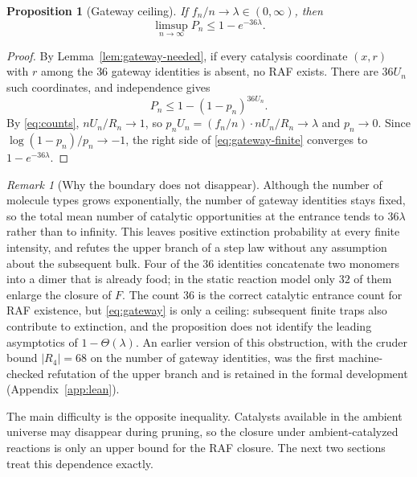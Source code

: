 \documentclass[11pt,reqno]{amsart}
\theoremstyle{plain}
\newtheorem{proposition}[theorem]{Proposition}
\theoremstyle{definition}
\theoremstyle{remark}
\newtheorem{remark}[theorem]{Remark}
\numberwithin{equation}{section}
\begin{document}
\begin{proposition}[Gateway ceiling]\label{prop:gateway}
If $f_n/n\to\lambda\in(0,\infty)$, then
\begin{equation}\label{eq:gateway}
\limsup_{n\to\infty}P_n\le1-e^{-36\lambda}.
\end{equation}
\end{proposition}

\begin{proof}
By Lemma~\ref{lem:gateway-needed}, if every catalysis coordinate $(x,r)$ with $r$ among the $36$ gateway identities is absent, no RAF exists. There are $36U_n$ such coordinates, and independence gives
\begin{equation}\label{eq:gateway-finite}
P_n\le1-(1-p_n)^{36U_n}.
\end{equation}
By \eqref{eq:counts}, $nU_n/R_n\to1$, so $p_nU_n=(f_n/n)\cdot nU_n/R_n\to\lambda$ and $p_n\to0$. Since $\log(1-p_n)/p_n\to-1$, the right side of \eqref{eq:gateway-finite} converges to $1-e^{-36\lambda}$.
\end{proof}

\begin{remark}[Why the boundary does not disappear]
Although the number of molecule types grows exponentially, the number of gateway identities stays fixed, so the total mean number of catalytic opportunities at the entrance tends to $36\lambda$ rather than to infinity. This leaves positive extinction probability at every finite intensity, and refutes the upper branch of a step law without any assumption about the subsequent bulk. Four of the $36$ identities concatenate two monomers into a dimer that is already food; in the static reaction model only $32$ of them enlarge the closure of $F$. The count $36$ is the correct catalytic entrance count for RAF existence, but \eqref{eq:gateway} is only a ceiling: subsequent finite traps also contribute to extinction, and the proposition does not identify the leading asymptotics of $1-\Theta(\lambda)$. An earlier version of this obstruction, with the cruder bound $|R_4|=68$ on the number of gateway identities, was the first machine-checked refutation of the upper branch and is retained in the formal development (Appendix~\ref{app:lean}).
\end{remark}

The main difficulty is the opposite inequality. Catalysts available in the ambient universe may disappear during pruning, so the closure under ambient-catalyzed reactions is only an upper bound for the RAF closure. The next two sections treat this dependence exactly.
\end{document}
